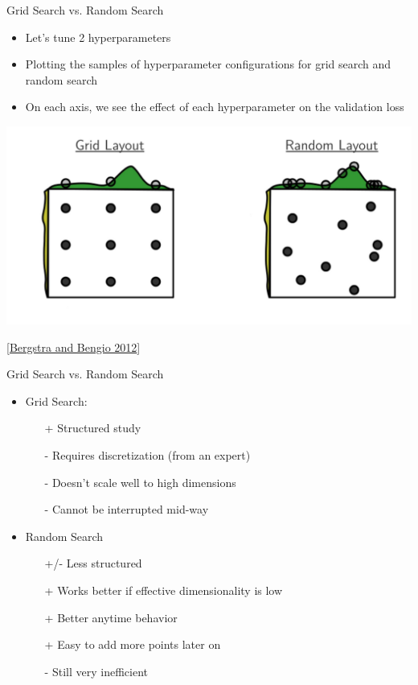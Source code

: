 \documentclass[aspectratio=169]{../latex_main/tntbeamer}  %
\begin{document}
\begin{frame}[c]{Grid Search vs. Random Search}

\vspace{-1em}
\begin{itemize}
    \item Let's tune 2 hyperparameters 
    \item Plotting the samples of hyperparameter configurations for grid search and random search
    \item On each axis, we see the effect of each hyperparameter on the \alert{validation loss}
\end{itemize}

\centering
\includegraphics[width=.72\textwidth]{grid_random.jpg}

\footnotesize
[\href{https://www.jmlr.org/papers/volume13/bergstra12a/bergstra12a.pdf}{Bergstra and Bengio 2012}]


\end{frame}
\begin{frame}[c]{Grid Search vs. Random Search}
	
\begin{itemize}
    \item Grid Search:
    \begin{itemize}
        \item[+] Structured study
        \item[-] Requires discretization (from an expert)
        \item[-] Doesn't scale well to high dimensions
        \item[-] Cannot be interrupted mid-way
    \end{itemize}
    \item Random Search
    \begin{itemize}
        \item[+/-] Less structured
        \item[+] Works better if effective dimensionality is low 
        \item[+] Better anytime behavior
        \item[+] Easy to add more points later on
        \item[-] Still very inefficient
    \end{itemize}
\end{itemize}
\end{frame}
\end{document}
